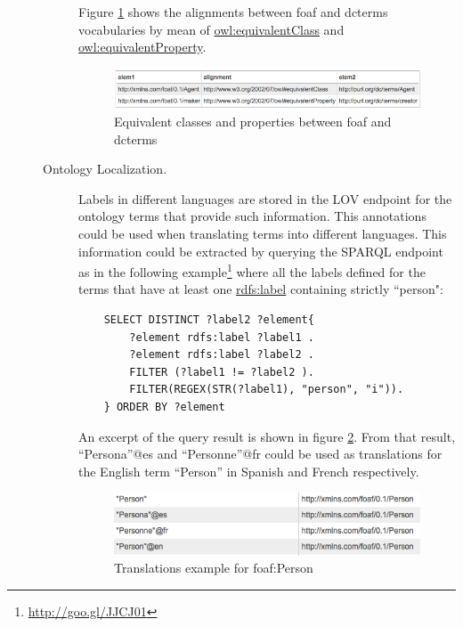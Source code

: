 \begin{description}
\begin{description}
	Figure \ref{fig:eqCR} shows the alignments between foaf and dcterms vocabularies by mean of \url{owl:equivalentClass} and \url{owl:equivalentProperty}.
    \begin{figure}
      \centering
      \includegraphics[width=1.0\linewidth]{img/equivalentCandR.png}
      \caption{Equivalent classes and properties between foaf and dcterms}
      \label{fig:eqCR}
    \end{figure}
 \item [Ontology Localization.] Labels in different languages are stored in the LOV endpoint for the ontology terms that provide such information. This annotations could be used when translating terms into different languages. This information could be extracted by querying the SPARQL endpoint as in the following example\footnote{\url{http://goo.gl/JJCJ01}} where all the labels defined for the terms that have at least one \url{rdfs:label} containing strictly ``person":
		
    {\small\begin{verbatim}
    SELECT DISTINCT ?label2 ?element{
		?element rdfs:label ?label1 .
		?element rdfs:label ?label2 .
		FILTER (?label1 != ?label2 ).
		FILTER(REGEX(STR(?label1), "person", "i")).
	} ORDER BY ?element\end{verbatim}}
							
   An excerpt of the query result is shown in figure \ref{fig:translations}. From that result, ``Persona''@es and ``Personne''@fr could be used as translations for the English term ``Person'' in Spanish and French respectively.
   \begin{figure}
     \centering
     \includegraphics[width=.90\linewidth]{img/translations1.png}
     \caption{Translations example for foaf:Person}
     \label{fig:translations}
   \end{figure}
\end{description}


\end{description}
